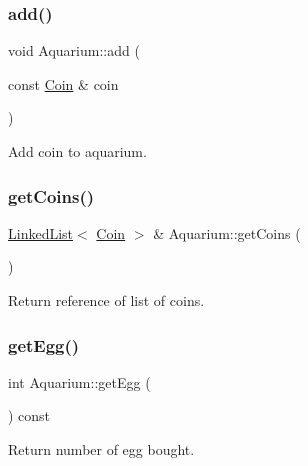 \subsubsection{\texorpdfstring{add()}{add()}\hspace{0.1cm}{\footnotesize\ttfamily [5/5]}}
{\footnotesize\ttfamily void Aquarium\+::add (\begin{DoxyParamCaption}\item[{const \mbox{\hyperlink{class_coin}{Coin}} \&}]{coin }\end{DoxyParamCaption})}



Add coin to aquarium. 

\mbox{\label{class_aquarium_a2524ad6a6a267f58251a9edc514fab53}} 
\subsubsection{\texorpdfstring{get\+Coins()}{getCoins()}}
{\footnotesize\ttfamily \mbox{\hyperlink{class_linked_list}{Linked\+List}}$<$ \mbox{\hyperlink{class_coin}{Coin}} $>$ \& Aquarium\+::get\+Coins (\begin{DoxyParamCaption}{ }\end{DoxyParamCaption})}



Return reference of list of coins. 

\mbox{\label{class_aquarium_afeeff766ee2f6e30127f287e8ff98094}} 
\subsubsection{\texorpdfstring{get\+Egg()}{getEgg()}}
{\footnotesize\ttfamily int Aquarium\+::get\+Egg (\begin{DoxyParamCaption}{ }\end{DoxyParamCaption}) const}



Return number of egg bought. 

\mbox{\label{class_aquarium_ad35796994738d4b6f2d7ffd5660b52ef}} 
